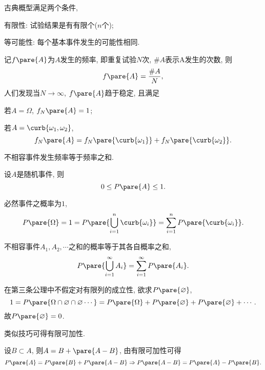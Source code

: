 \documentclass[../Statistics.tex]{subfiles}
\begin{document}
\begin{definition}[古典概型]
    古典概型满足两个条件,
    \begin{cenum}
        \item 有限性: 试验结果是有有限个($n$个);
        \item 等可能性: 每个基本事件发生的可能性相同.
    \end{cenum}
\end{definition}
记$f\pare{A}$为$A$发生的频率, 即重复试验$N$次, $\#A$表示A发生的次数, 则
\[ f\pare{A} = \frac{\# A}{N}, \]
人们发现当$N\rightarrow \infty$, $f\pare{A}$趋于稳定, 且满足
\begin{cenum}
    \item 若$A=\Omega$, $f_N\pare{A} = 1$;
    \item 若$A=\curb{\omega_1,\omega_2}$,
    \[ f_N\pare{A} = f_N\pare{\curb{\omega_1}} + f_N\pare{\curb{\omega_2}}. \]
    \item 不相容事件发生频率等于频率之和.
\end{cenum}
\begin{finale}
    \begin{axiom}[概率的公理化定义]
        \mbox{}
        \begin{cenum}
            \item 设$A$是随机事件, 则
            \[ 0\le P\pare{A} \le 1. \]
            \item 必然事件之概率为$1$,
            \[ P\pare{\Omega} = 1 = P\pare{\bigcup_{i=1}^n \curb{\omega_i}} = \sum_{i=1}^n P\pare{\curb{\omega_i}}. \]
            \item 不相容事件$A_1,A_2,\cdots$之和的概率等于其各自概率之和,
            \[ P\pare{\bigcup_{i=1}^\infty A_i} = \sum_{i=1}^\infty P\pare{A_i}. \]
        \end{cenum}
    \end{axiom}
\end{finale}
\begin{sample}
    \begin{ex}
        在第三条公理中不假定对有限列的成立性, 欲求$P\pare{\varnothing}$,
        \[ 1 = P\pare{\Omega \cap \varnothing \cap \varnothing \cdots} = P\pare{\Omega} + P\pare{\varnothing} + P\pare{\varnothing} + \cdots. \]
        故$P\pare{\varnothing} = 0$.
    \end{ex}
    \begin{ex}
        类似技巧可得有限可加性.
    \end{ex}
    \begin{ex}
        设$B\subset A$, 则$A = B + \pare{A-B}$, 由有限可加性可得
        \[ P\pare{A} = P\pare{B} + P\pare{A-B} \Rightarrow P\pare{A-B} = P\pare{A} - P\pare{B}. \]
    \end{ex}
\end{sample}
\end{document}
